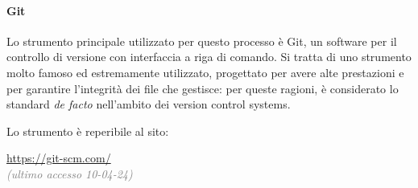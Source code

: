\paragraph{Git}
Lo strumento principale utilizzato per questo processo è Git, un software per il controllo di versione con interfaccia a riga di comando. Si tratta di uno strumento molto famoso ed estremamente utilizzato, progettato per avere alte prestazioni e per garantire l'integrità dei file che gestisce: per queste ragioni, è considerato lo standard \textit{de facto} nell'ambito dei version control systems.
\par Lo strumento è reperibile al sito:
\begin{center}
    \url{https://git-scm.com/}\\ \textcolor{gray}{\textit{(ultimo accesso 10-04-24)}}
\end{center}
